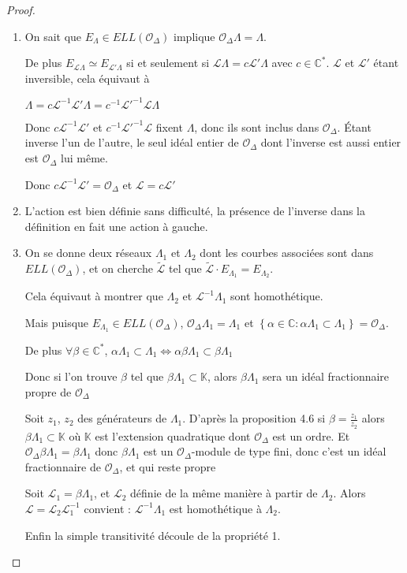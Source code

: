 \documentclass{article}
\newcommand{\C}[0]{\mathbb{C}}
\newcommand{\K}[0]{\mathbb{K}}
\newcommand{\OR}[0]{\mathcal{O}}
\newcommand{\LR}[0]{\mathcal{L}}
\newcommand{\CL}[0]{\tilde{\LR}}
\begin{document}
\begin{proof}
	\begin{enumerate}
		\item On sait que $E_{\Lambda}\in ELL(\OR_{\Delta})$ implique $\OR_{\Delta}\Lambda = \Lambda$.
		
		De plus $E_{\LR\Lambda} \simeq E_{\LR'\Lambda}$ si et seulement si $\LR\Lambda = c\LR'\Lambda$ avec $c\in\C^{*}$. $\LR$ et $\LR'$ étant inversible, cela équivaut à 
		
		$\Lambda = c\LR^{-1}\LR'\Lambda = c^{-1}\LR'^{-1}\LR\Lambda$
		
		Donc $c\LR^{-1}\LR'$ et $c^{-1}\LR'^{-1}\LR$ fixent $\Lambda$, donc ils sont inclus dans $\OR_{\Delta}$. Étant inverse l'un de l'autre, le seul idéal entier de $\OR_{\Delta}$ dont l'inverse est aussi entier est $\OR_{\Delta}$ lui même.
		
		Donc $c\LR^{-1}\LR' = \OR_{\Delta}$ et $\LR = c\LR'$
		
		\item L'action est bien définie sans difficulté, la présence de l'inverse dans la définition en fait une action à gauche.
		
		\item On se donne deux réseaux $\Lambda_1$ et $\Lambda_2$ dont les courbes associées sont dans $ELL(\OR_{\Delta})$, et on cherche $\CL$ tel que $\CL\cdot E_{\Lambda_1} = E_{\Lambda_2}$.
		
		
		Cela équivaut à montrer que $\Lambda_2$ et $\LR^{-1}\Lambda_1$ sont homothétique. 
		
		Mais puisque $E_{\Lambda_1}\in ELL(\OR_{\Delta})$, $\OR_{\Delta}\Lambda_1 = \Lambda_1$ et $\left\lbrace \alpha\in\C : \alpha\Lambda_1\subset\Lambda_1\right\rbrace = \OR_{\Delta}$. 
		
		De plus $\forall \beta\in\C^{*}$, $\alpha\Lambda_1\subset\Lambda_1\iff\alpha\beta\Lambda_1\subset\beta\Lambda_1$
		
		Donc si l'on trouve $\beta$ tel que $\beta\Lambda_1\subset\K$, alors $\beta\Lambda_1$ sera un idéal fractionnaire propre de $\OR_{\Delta}$
		
		Soit $z_1$, $z_2$ des générateurs de $\Lambda_1$. D'après la proposition 4.6 si $\beta = \frac{z_1}{z_2}$ alors $\beta\Lambda_1\subset\K$ où $\K$ est l'extension quadratique dont $\OR_{\Delta}$ est un ordre. Et $\OR_{\Delta}\beta\Lambda_1 = \beta\Lambda_1$ donc $\beta\Lambda_1$ est un $\OR_{\Delta}$-module de type fini, donc c'est un idéal fractionnaire de $\OR_{\Delta}$, et qui reste propre
		
		Soit $\LR_1 = \beta\Lambda_1$, et $\LR_2$ définie de la même manière à partir de $\Lambda_2$. Alors $\LR = \LR_2\LR_1^{-1}$ convient : $\LR^{-1}\Lambda_1$ est homothétique à $\Lambda_2$.
		
		Enfin la simple transitivité découle de la propriété 1.
		
	\end{enumerate}
	
\end{proof}
\end{document}
